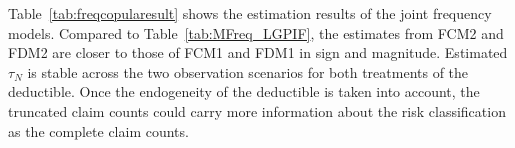 \documentclass[11pt]{article}
\newcommand{\rev}[1]{{\color{blue}#1}}
\begin{document}
{%



\rev{Table~\ref{tab:freqcopularesult} shows the estimation results of the joint frequency models. Compared to Table~\ref{tab:MFreq_LGPIF}, the estimates from FCM2 and FDM2 are closer to those of FCM1 and FDM1 in sign and magnitude. Estimated $\tau_N$ is stable across the two observation scenarios for both treatments of the deductible. Once the endogeneity of the deductible is taken into account, the truncated claim counts could carry more information about the risk classification as the complete claim counts.} %

}
\end{document}
